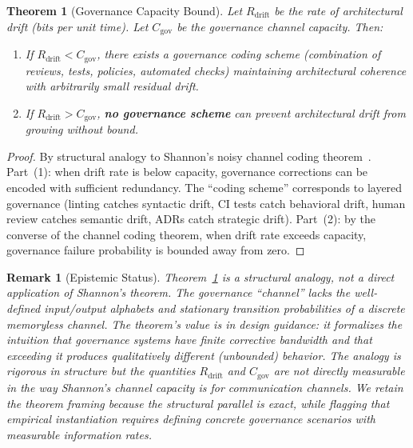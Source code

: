 \documentclass[11pt, a4paper, logo, copyright]{googledeepmind}
\newtheorem{theorem}{Theorem}[section]
\newtheorem*{remark}{Remark}
\begin{document}
\begin{theorem}[Governance Capacity Bound]
\label{thm:capacity}
Let $R_{\mathrm{drift}}$ be the rate of architectural drift (bits per unit time). Let $C_{\mathrm{gov}}$ be the governance channel capacity. Then:
\begin{enumerate}
    \item If $R_{\mathrm{drift}} < C_{\mathrm{gov}}$, there exists a governance coding scheme (combination of reviews, tests, policies, automated checks) maintaining architectural coherence with arbitrarily small residual drift.
    \item If $R_{\mathrm{drift}} > C_{\mathrm{gov}}$, \textbf{no governance scheme} can prevent architectural drift from growing without bound.
\end{enumerate}
\end{theorem}

\begin{proof}
By structural analogy to Shannon's noisy channel coding theorem~\citep{shannon1948}. Part~(1): when drift rate is below capacity, governance corrections can be encoded with sufficient redundancy. The ``coding scheme'' corresponds to layered governance (linting catches syntactic drift, CI tests catch behavioral drift, human review catches semantic drift, ADRs catch strategic drift). Part~(2): by the converse of the channel coding theorem, when drift rate exceeds capacity, governance failure probability is bounded away from zero.
\end{proof}

\begin{remark}[Epistemic Status]
\label{rem:channel-epistemic}
Theorem~\ref{thm:capacity} is a \emph{structural analogy}, not a direct application of Shannon's theorem. The governance ``channel'' lacks the well-defined input/output alphabets and stationary transition probabilities of a discrete memoryless channel. The theorem's value is in design guidance: it formalizes the intuition that governance systems have finite corrective bandwidth and that exceeding it produces qualitatively different (unbounded) behavior. The analogy is rigorous in structure but the quantities $R_{\mathrm{drift}}$ and $C_{\mathrm{gov}}$ are not directly measurable in the way Shannon's channel capacity is for communication channels. We retain the theorem framing because the structural parallel is exact, while flagging that empirical instantiation requires defining concrete governance scenarios with measurable information rates.
\end{remark}
\end{document}
